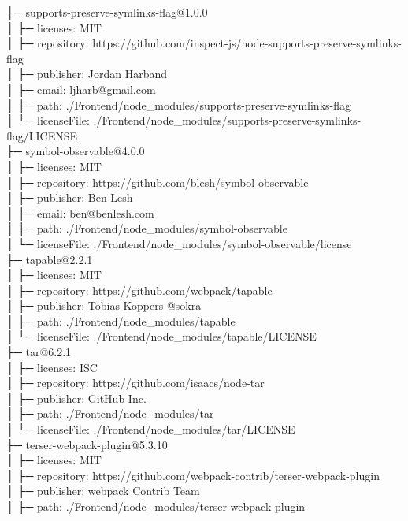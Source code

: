 ├─ supports-preserve-symlinks-flag@1.0.0\\
│  ├─ licenses: MIT\\
│  ├─ repository: https://github.com/inspect-js/node-supports-preserve-symlinks-flag\\
│  ├─ publisher: Jordan Harband\\
│  ├─ email: ljharb@gmail.com\\
│  ├─ path: ./Frontend/node\_modules/supports-preserve-symlinks-flag\\
│  └─ licenseFile: ./Frontend/node\_modules/supports-preserve-symlinks-flag/LICENSE\\
├─ symbol-observable@4.0.0\\
│  ├─ licenses: MIT\\
│  ├─ repository: https://github.com/blesh/symbol-observable\\
│  ├─ publisher: Ben Lesh\\
│  ├─ email: ben@benlesh.com\\
│  ├─ path: ./Frontend/node\_modules/symbol-observable\\
│  └─ licenseFile: ./Frontend/node\_modules/symbol-observable/license\\
├─ tapable@2.2.1\\
│  ├─ licenses: MIT\\
│  ├─ repository: https://github.com/webpack/tapable\\
│  ├─ publisher: Tobias Koppers @sokra\\
│  ├─ path: ./Frontend/node\_modules/tapable\\
│  └─ licenseFile: ./Frontend/node\_modules/tapable/LICENSE\\
├─ tar@6.2.1\\
│  ├─ licenses: ISC\\
│  ├─ repository: https://github.com/isaacs/node-tar\\
│  ├─ publisher: GitHub Inc.\\
│  ├─ path: ./Frontend/node\_modules/tar\\
│  └─ licenseFile: ./Frontend/node\_modules/tar/LICENSE\\
├─ terser-webpack-plugin@5.3.10\\
│  ├─ licenses: MIT\\
│  ├─ repository: https://github.com/webpack-contrib/terser-webpack-plugin\\
│  ├─ publisher: webpack Contrib Team\\
│  ├─ path: ./Frontend/node\_modules/terser-webpack-plugin\\
